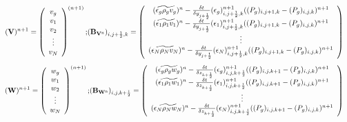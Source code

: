 %
\begin{eqnarray}
\htmlimage{}
({\bf V})^{n+1} =
\left( \begin{array}{c}
v_g \\
v_1 \\
v_2 \\
\vdots \\
v_N \end{array} \right )^{(n+1)}; &
({\bf B_{V^{\rm n}}})_{i,j+\frac{1}{2},k} = 
\left( \begin{array}{c}
(\widetilde {\epsilon_g \rho_g v_g})^n - 
\frac{\delta t}{\delta y_{j+\frac{1}{2}}} 
(\epsilon_g)_{i,j+\frac{1}{2},k}^{n+1} ((P_g)_{i,j+1,k} - (P_g)_{i,j,k})^{n+1}     \\
(\widetilde {\epsilon_1 \rho_1 v_1})^n - 
\frac{\delta t}{\delta y_{j+\frac{1}{2}}} 
(\epsilon_1)_{i,j+\frac{1}{2},k}^{n+1} ((P_g)_{i,j+1,k} - (P_g)_{i,j,k})^{n+1}     \\
\vdots        \\
(\widetilde {\epsilon_N \rho_N v_N})^n -
\frac{\delta t}{\delta y_{j+\frac{1}{2}}} 
(\epsilon_N)_{i,j+\frac{1}{2},k}^{n+1} ((P_g)_{i,j+1,k} - (P_g)_{i,j,k})^{n+1}
\end{array} \right )
\nonumber
\end{eqnarray}
%
\begin{eqnarray}
\htmlimage{}
({\bf W})^{n+1} =
\left( \begin{array}{c}
w_g \\
w_1 \\
w_2 \\
\vdots \\
w_N \end{array} \right )^{(n+1)}; &
({\bf B_{W^{\rm n}}})_{i,j,k+\frac{1}{2}} = 
\left( \begin{array}{c}
(\widetilde {\epsilon_g \rho_g w_g})^n - 
\frac{\delta t}{\delta z_{k+\frac{1}{2}}} 
(\epsilon_g)_{i,j,k+\frac{1}{2}}^{n+1} ((P_g)_{i,j,k+1} - (P_g)_{i,j,k})^{n+1}     \\
(\widetilde {\epsilon_1 \rho_1 w_1})^n - 
\frac{\delta t}{\delta z_{k+\frac{1}{2}}} 
(\epsilon_1)_{i,j,k+\frac{1}{2}}^{n+1} ((P_g)_{i,j,k+1} - (P_g)_{i,j,k})^{n+1}     \\
\vdots        \\
(\widetilde {\epsilon_N \rho_N w_N})^n -
\frac{\delta t}{\delta z_{k+\frac{1}{2}}} 
(\epsilon_N)_{i,j,k+\frac{1}{2}}^{n+1} ((P_g)_{i,j,k+1} - (P_g)_{i,j,k})^{n+1}
\end{array} \right )
\nonumber
\end{eqnarray}
\newpage
